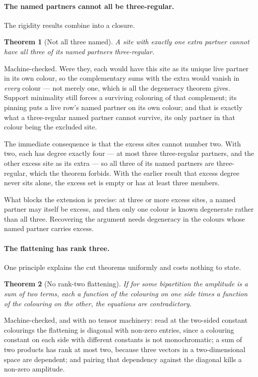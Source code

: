 \documentclass[11pt]{article}
\newtheorem{theorem}{Theorem}[section]
\theoremstyle{definition}
\theoremstyle{remark}
\begin{document}
\paragraph{The named partners cannot all be three-regular.} The rigidity results combine into
a closure.

\begin{theorem}[Not all three named]\label{thm:notallnamed}
A site with exactly one extra partner cannot have all three of its named partners
three-regular.
\end{theorem}

Machine-checked. Were they, each would have this site as its unique live partner in its own
colour, so the complementary sums with the extra would vanish in \emph{every} colour --- not
merely one, which is all the degeneracy theorem gives. Support minimality still forces a
surviving colouring of that complement; its pinning puts a live row's named partner on its own
colour; and that is exactly what a three-regular named partner cannot survive, its only partner
in that colour being the excluded site.

The immediate consequence is that the excess sites cannot number two. With two, each has degree
exactly four --- at most three three-regular partners, and the other excess site as its extra
--- so all three of its named partners are three-regular, which the theorem forbids. With the
earlier result that excess degree never sits alone, the excess set is empty or has at least
three members.

What blocks the extension is precise: at three or more excess sites, a named partner may itself
be excess, and then only one colour is known degenerate rather than all three. Recovering the
argument needs degeneracy in the colours whose named partner carries excess.

\paragraph{The flattening has rank three.} One principle explains the cut theorems uniformly
and costs nothing to state.

\begin{theorem}[No rank-two flattening]\label{thm:rank2}
If for some bipartition the amplitude is a sum of two terms, each a function of the colouring
on one side times a function of the colouring on the other, the equations are contradictory.
\end{theorem}

Machine-checked, and with no tensor machinery: read at the two-sided constant colourings the
flattening is diagonal with non-zero entries, since a colouring constant on each side with
different constants is not monochromatic; a sum of two products has rank at most two, because
three vectors in a two-dimensional space are dependent; and pairing that dependency against the
diagonal kills a non-zero amplitude.
\end{document}

